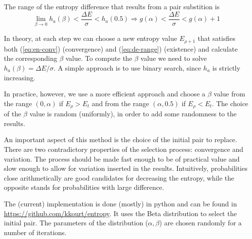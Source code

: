 \documentclass[9pt,a4paper]{article}
\begin{document}
The range of the entropy difference that results from a pair substition is
\begin{equation}
 \lim_{\beta \to 0}h_a(\beta) < \frac{\Delta E}{\sigma} <  h_a(0.5) \Rightarrow 
 g(\alpha) < \frac{\Delta E}{\sigma} < g(\alpha) + 1
 \label{eq:de-range}
\end{equation}


In theory, at each step we can choose a new entropy value \( E_{\rho+1} \) that
satisfies both (\ref{eq:en-conv})  (convergence) and (\ref{eq:de-range})
(existence) and calculate the corresponding $\beta$ value. To compute the
$\beta$ value we need to solve \( h_a(\beta) = {\Delta E}/\sigma \). A simple
approach is to use binary search, since $h_a$ is strictly increasing. 

In practice, however, we use a more efficient approach and choose a $\beta$
value from the range $(0,\alpha)$ if $E_\rho > E_t$ and from the range
$(\alpha,0.5)$ if  $E_\rho < E_t$. The choice of the $\beta$ value is random
(uniformly), in order to add some randomness to the results.

An important aspect of this method is the choice of the initial pair to
replace. There are two contradictory properties of the selection process:
convergence and variation. The process should be made fast enough to be of
practical value and slow enough to allow for variation inserted in the results.
Intuitively, probabilities close arithmetically are good candidates for
decreasing the entropy, while the opposite stands for probabilities with large
difference.

The (current) implementation is done (mostly) in python and can be found in
\url{https://github.com/kkourt/entropy}. It uses the Beta
distribution to select the initial pair. The parameters of the distribution
($\alpha, \beta$) are chosen randomly for a number of iterations. 

\end{document}
